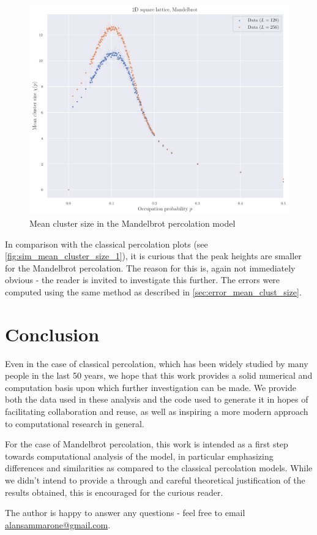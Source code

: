 \begin{figure}[H]
  \includegraphics[width=\linewidth]{Images/simm_mean_cluster_size_1.png}
  \caption{Mean cluster size in the Mandelbrot percolation model}
  \label{fig:simm_mean_cluster_size_1}
\end{figure}

In comparison with the classical percolation plots (see \autoref{fig:sim_mean_cluster_size_1}), it is curious that the peak heights are smaller for the Mandelbrot percolation. The reason for this is, again not immediately obvious - the reader is invited to investigate this further.
The errors were computed using the same method as described in \autoref{sec:error_mean_clust_size}.

\section{Conclusion}

Even in the case of classical percolation, which has been widely studied by many people in the last 50 years, we hope that this work provides a solid numerical and computation basis upon which further investigation can be made. We provide both the data used in these analysis and the code used to generate it in hopes of facilitating collaboration and reuse, as well as inspiring a more modern approach to computational research in general. 

For the case of Mandelbrot percolation, this work is intended as a first step towards computational analysis of the model, in particular emphasizing differences and similarities as compared to the classical percolation models. While we didn't intend to provide a through and careful theoretical justification of the results obtained, this is encouraged for the curious reader. 

The author is happy to answer any questions - feel free to email \url{alansammarone@gmail.com}.
